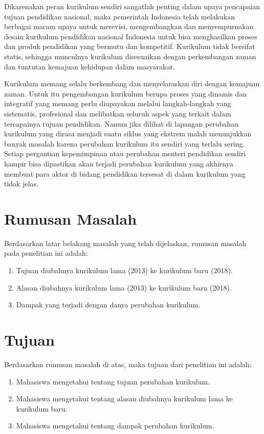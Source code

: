 \documentclass[a4paper,twoside]{article}
\begin{document}
Dikarenakan peran kurikulum sendiri sangatlah penting dalam upaya pencapaian tujuan pendidikan nasional, maka pemerintah Indonesia telah melakukan berbagai macam upaya untuk merevisi, mengembangkan dan menyempurnakan desain kurikulum pendidikan nasional Indonesia untuk bisa menghasilkan proses dan produk pendidikan yang bermutu dan kompetitif. Kurikulum tidak bersifat statis, sehingga munculnya kurikulum disesuaikan dengan perkembangan zaman dan tuntutan kemajuan kehidupan dalam masyarakat.

Kurikulum memang selalu berkembang dan menyelaraskan diri dengan kemajuan zaman. Untuk itu  pengembangan kurikulum berupa proses yang dinamis dan integratif yang memang perlu diupayakan melalui langkah-langkah yang sistematis, profesional dan melibatkan seluruh aspek yang terkait dalam tercapainya tujuan pendidikan. Namun jika dilihat di lapangan perubahan kurikulum yang dirasa menjadi suatu siklus yang ekstrem malah menunjukkan banyak masalah karena perubahan kurikulum itu sendiri yang terlalu sering. Setiap pergantian kepemimpinan atau perubahan menteri pendidikan sendiri hampir bisa dipastikan akan terjadi perubahan kurikulum yang akhirnya membuat para aktor di bidang pendidikan tersesat di dalam kurikulum yang tidak jelas.

\section{Rumusan Masalah}
Berdasarkan latar belakang masalah yang telah dijelaskan, rumusan masalah pada penelitian ini adalah:
\begin{enumerate}
\item Tujuan diubahnya kurikulum lama (2013) ke kurikulum baru (2018).
\item Alasan diubahnya kurikulum lama (2013) ke kurikulum baru (2018).
\item Dampak yang terjadi dengan danya perubahan kurikulum.
\end{enumerate} 


\section{Tujuan}
Berdasarkan rumusan masalah di atas, maka tujuan dari penelitian ini adalah: 
\begin{enumerate}
\item Mahasiswa mengetahui tentang tujuan perubahan kurikulum.
\item Mahasiswa mengetahui tentang alasan diubahnya kurikulum lama ke kurikulum baru.
\item Mahasiswa mengetahui tentang dampak perubahan kurikulum.
\end{enumerate}
\end{document}
